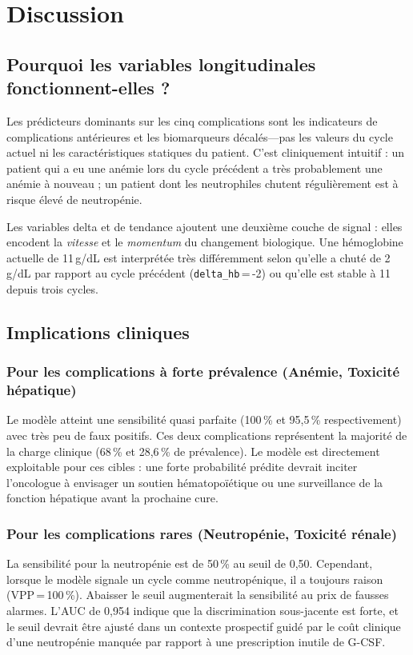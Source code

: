 \documentclass[12pt,a4paper]{report}
\begin{document}
\chapter{Discussion}
\label{chap:discussion}

\section{Pourquoi les variables longitudinales fonctionnent-elles ?}

Les prédicteurs dominants sur les cinq complications sont les indicateurs de complications antérieures et les biomarqueurs décalés---pas les valeurs du cycle actuel ni les caractéristiques statiques du patient. C'est cliniquement intuitif : un patient qui a eu une anémie lors du cycle précédent a très probablement une anémie à nouveau ; un patient dont les neutrophiles chutent régulièrement est à risque élevé de neutropénie.

Les variables delta et de tendance ajoutent une deuxième couche de signal : elles encodent la \emph{vitesse} et le \emph{momentum} du changement biologique. Une hémoglobine actuelle de 11\,g/dL est interprétée très différemment selon qu'elle a chuté de 2\,g/dL par rapport au cycle précédent (\texttt{delta\_hb}\,=\,-2) ou qu'elle est stable à 11 depuis trois cycles.

\section{Implications cliniques}

\subsection{Pour les complications à forte prévalence (Anémie, Toxicité hépatique)}
Le modèle atteint une sensibilité quasi parfaite (100\,\% et 95,5\,\% respectivement) avec très peu de faux positifs. Ces deux complications représentent la majorité de la charge clinique (68\,\% et 28,6\,\% de prévalence). Le modèle est directement exploitable pour ces cibles : une forte probabilité prédite devrait inciter l'oncologue à envisager un soutien hématopoïétique ou une surveillance de la fonction hépatique avant la prochaine cure.

\subsection{Pour les complications rares (Neutropénie, Toxicité rénale)}
La sensibilité pour la neutropénie est de 50\,\% au seuil de 0,50. Cependant, lorsque le modèle signale un cycle comme neutropénique, il a toujours raison (VPP\,=\,100\,\%). Abaisser le seuil augmenterait la sensibilité au prix de fausses alarmes. L'AUC de 0,954 indique que la discrimination sous-jacente est forte, et le seuil devrait être ajusté dans un contexte prospectif guidé par le coût clinique d'une neutropénie manquée par rapport à une prescription inutile de G-CSF.
\end{document}
